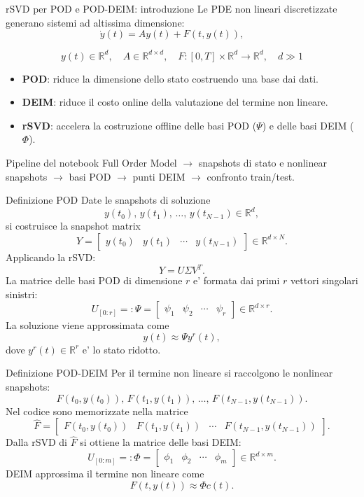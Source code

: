 \documentclass[10pt,aspectratio=169,handout]{beamer}
\begin{document}
\begin{frame}{rSVD per POD e POD-DEIM: introduzione}
Le PDE non lineari discretizzate generano sistemi ad altissima dimensione:
\[
\dot y(t)=Ay(t)+F(t,y(t)), \qquad 
\]

\[
y(t)\in\mathbb{R}^{d}, \quad A \in \mathbb{R}^{d \times d}, \quad F:[0, T] \times \mathbb{R}^d \rightarrow \mathbb{R}^d, \quad d\gg 1
\]
\begin{itemize}
  \item \textbf{POD}: riduce la dimensione dello stato costruendo una base dai dati.
  \item \textbf{DEIM}: riduce il costo online della valutazione del termine non lineare.
    \item \textbf{rSVD}: accelera la costruzione offline delle basi POD ($\Psi$) e delle basi DEIM ($\Phi$).
\end{itemize}
\begin{block}{Pipeline del notebook}
Full Order Model $\rightarrow$ snapshots di stato e nonlinear snapshots $\rightarrow$ basi POD $\rightarrow$ punti DEIM $\rightarrow$ confronto train/test.
\end{block}
\end{frame}

\begin{frame}{Definizione POD}
Date le snapshots di soluzione
\[
y(t_0),\,y(t_1),\,\ldots,\,y(t_{N-1})\in\mathbb{R}^{d},
\]
si costruisce la snapshot matrix
\[
Y=\begin{bmatrix}y(t_0)&y(t_1)&\cdots&y(t_{N-1})\end{bmatrix}
\in\mathbb{R}^{d\times N}.
\]
Applicando la rSVD:
\[
Y=U\Sigma V^T.
\]
La matrice delle basi POD di dimensione $r$ e' formata dai primi $r$ vettori singolari sinistri:
\[
U_{[0:r]}=:\Psi=\begin{bmatrix}\psi_1&\psi_2&\cdots&\psi_r\end{bmatrix}\in\mathbb{R}^{d\times r}.
\]
La soluzione viene approssimata come
\[
y(t)\approx \Psi y^r(t),
\]
dove $y^r(t)\in\mathbb{R}^{r}$ e' lo stato ridotto.
\end{frame}

\begin{frame}{Definizione POD-DEIM}
Per il termine non lineare si raccolgono le nonlinear snapshots:
\[
F(t_0,y(t_0)),\,F(t_1,y(t_1)),\,\ldots,\,F(t_{N-1},y(t_{N-1})).
\]
Nel codice sono memorizzate nella matrice
\[
\widehat F=
\begin{bmatrix}
F(t_0,y(t_0))&F(t_1,y(t_1))&\cdots&F(t_{N-1},y(t_{N-1}))
\end{bmatrix}.
\]
Dalla rSVD di $\widehat F$ si ottiene la matrice delle basi DEIM:
\[
U_{[0:m]}=:\Phi=\begin{bmatrix}\phi_1&\phi_2&\cdots&\phi_m\end{bmatrix}\in\mathbb{R}^{d\times m}.
\]
DEIM approssima il termine non lineare come
\[
F(t,y(t))\approx \Phi c(t).
\]
\end{frame}
\end{document}

